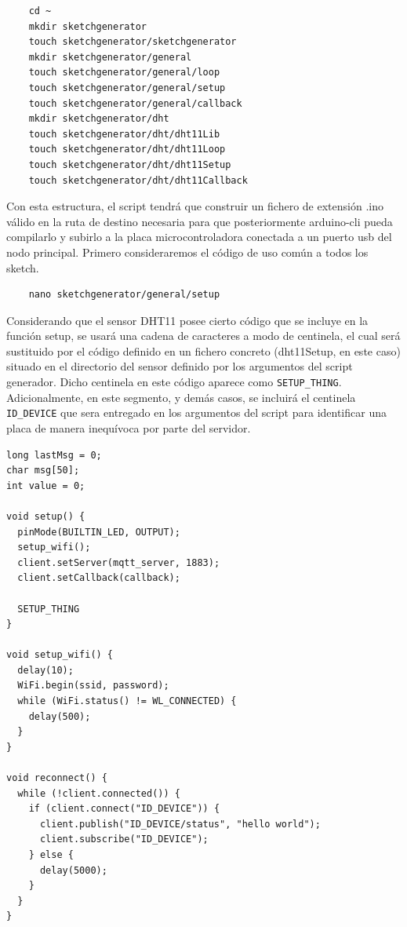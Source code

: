 \begin{verbatim}
    cd ~
    mkdir sketchgenerator
    touch sketchgenerator/sketchgenerator
    mkdir sketchgenerator/general
    touch sketchgenerator/general/loop
    touch sketchgenerator/general/setup
    touch sketchgenerator/general/callback
    mkdir sketchgenerator/dht
    touch sketchgenerator/dht/dht11Lib
    touch sketchgenerator/dht/dht11Loop
    touch sketchgenerator/dht/dht11Setup
    touch sketchgenerator/dht/dht11Callback
\end{verbatim}

Con esta estructura, el \gls{script} tendrá que construir un fichero de extensión .ino válido en la ruta de destino necesaria para que posteriormente arduino-cli pueda compilarlo y subirlo a la placa microcontroladora conectada a un puerto \gls{usb} del nodo principal. Primero consideraremos el código de uso común a todos los \gls{sketch}.

\begin{verbatim}
    nano sketchgenerator/general/setup
\end{verbatim}

Considerando que el sensor DHT11 posee cierto código que se incluye en la función setup, se usará una cadena de caracteres a modo de centinela, el cual será sustituido por el código definido en un fichero concreto (dht11Setup, en este caso) situado en el directorio del sensor definido por los argumentos del script generador. Dicho centinela en este código aparece como \verb|SETUP_THING|. Adicionalmente, en este segmento, y demás casos, se incluirá el centinela \verb|ID_DEVICE| que sera entregado en los argumentos del script para identificar una placa de manera inequívoca por parte del servidor.

\begin{verbatim}
long lastMsg = 0;
char msg[50];
int value = 0;

void setup() {
  pinMode(BUILTIN_LED, OUTPUT);
  setup_wifi();
  client.setServer(mqtt_server, 1883);
  client.setCallback(callback);

  SETUP_THING
}

void setup_wifi() {
  delay(10);
  WiFi.begin(ssid, password);
  while (WiFi.status() != WL_CONNECTED) {
    delay(500);
  }
}

void reconnect() {
  while (!client.connected()) {
    if (client.connect("ID_DEVICE")) {
      client.publish("ID_DEVICE/status", "hello world");
      client.subscribe("ID_DEVICE");
    } else {
      delay(5000);
    }
  }
}
\end{verbatim}

